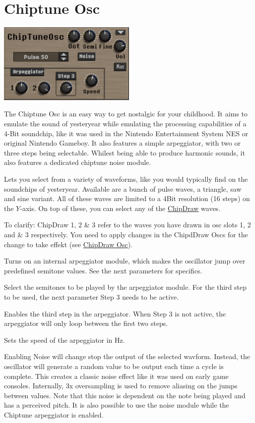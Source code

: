 \section{Chiptune Osc}
\begin{center}
    \includegraphics[width=0.5\textwidth]{graphics/chiptune_osc.png}
\end{center}
The Chiptune Osc is an easy way to get nostalgic for your childhood. It aims to emulate the sound of yesteryear while emulating the processing capabilities of a 4-Bit soundchip, like it was used in the Nintendo Entertainment System NES or original Nintendo Gameboy. It also features a simple arpeggiator, with two or three steps being selectable. Whilest being able to produce harmonic sounds, it also features a dedicated chiptune noise module.

Lets you select from a variety of waveforms, like you would typically find on the soundchips of yesteryear. Available are a bunch of pulse waves, a triangle, saw and sine variant. All of these waves are limited to a 4Bit resolution (16 steps) on the $Y$-axis. On top of these, you can select any of the \hyperref[chipdraw]{ChipDraw} waves. 

To clarify: ChipDraw 1, 2 \& 3 refer to the waves you have drawn in osc slots 1, 2 and \& 3 respectively. You need to apply changes in the ChipdDraw Oscs for the change to take effekt (see \hyperref[chipdraw]{ChipDraw Osc}).

Turns on an internal arpeggiator module, which makes the oscillator jump over predefined semitone values. See the next parameters for specifics.

Select the semitones to be played by the arpeggiator module. For the third step to be used, the next parameter Step 3 needs to be active.

Enables the third step in the arpeggiator. When Step 3 is not active, the arpeggiator will only loop between the first two steps.

Sets the speed of the arpeggiator in Hz.

Enabling Noise will change stop the output of the selected wavform. Instead, the oscillator will generate a random value to be output each time a cycle is complete. This creates a classic noise effect like it was used on early game consoles. Internally, 3x oversampling is used to remove aliasing on the jumps between values. Note that this noise is dependent on the note being played and has a perceived pitch. It is also possible to use the noise module while the Chiptune arpeggiator is enabled.




\label{wavedraw}
\label{chipdraw}